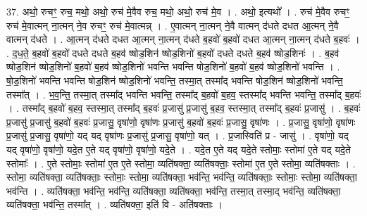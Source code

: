 \documentclass[17pt]{extarticle}
\begin{document}
37. अथो॒ रुचꣳ॒॒ रुच॒ मथो॒ अथो॒ रुच॑ मे॒वैव रुच॒ मथो॒ अथो॒ रुच॑ मे॒व । . अथो॒ इत्यथो᳚ । . रुच॑ मे॒वैव रुचꣳ॒॒ रुच॑ मे॒वात्मन् ना॒त्मन् ने॒व रुचꣳ॒॒ रुच॑ मे॒वात्मन्न् । . ए॒वात्मन् ना॒त्मन् ने॒वै वात्मन् द॑धते दधत आ॒त्मन् ने॒वै वात्मन् द॑धते । . आ॒त्मन् द॑धते दधत आ॒त्मन् ना॒त्मन् द॑धते ब॒हवो॑ ब॒हवो॑ दधत आ॒त्मन् ना॒त्मन् द॑धते ब॒हवः॑ । . द॒ध॒ते॒ ब॒हवो॑ ब॒हवो॑ दधते दधते ब॒हव॑ ष्षोड॒शिन॑ ष्षोड॒शिनो॑ ब॒हवो॑ दधते दधते ब॒हव॑ ष्षोड॒शिनः॑ । . ब॒हव॑ ष्षोड॒शिन॑ ष्षोड॒शिनो॑ ब॒हवो॑ ब॒हव॑ ष्षोड॒शिनो॑ भवन्ति भवन्ति षोड॒शिनो॑ ब॒हवो॑ ब॒हव॑ ष्षोड॒शिनो॑ भवन्ति । . षो॒ड॒शिनो॑ भवन्ति भवन्ति षोड॒शिन॑ ष्षोड॒शिनो॑ भवन्ति॒ तस्मा॒त् तस्मा᳚द् भवन्ति षोड॒शिन॑ ष्षोड॒शिनो॑ भवन्ति॒ तस्मा᳚त् । . भ॒व॒न्ति॒ तस्मा॒त् तस्मा᳚द् भवन्ति भवन्ति॒ तस्मा᳚द् ब॒हवो॑ ब॒हव॒ स्तस्मा᳚द् भवन्ति भवन्ति॒ तस्मा᳚द् ब॒हवः॑ । . तस्मा᳚द् ब॒हवो॑ ब॒हव॒ स्तस्मा॒त् तस्मा᳚द् ब॒हवः॑ प्र॒जासु॑ प्र॒जासु॑ ब॒हव॒ स्तस्मा॒त् तस्मा᳚द् ब॒हवः॑ प्र॒जासु॑ । . ब॒हवः॑ प्र॒जासु॑ प्र॒जासु॑ ब॒हवो॑ ब॒हवः॑ प्र॒जासु॒ वृषा॑णो॒ वृषा॑णः प्र॒जासु॑ ब॒हवो॑ ब॒हवः॑ प्र॒जासु॒ वृषा॑णः । . प्र॒जासु॒ वृषा॑णो॒ वृषा॑णः प्र॒जासु॑ प्र॒जासु॒ वृषा॑णो॒ यद् यद् वृषा॑णः प्र॒जासु॑ प्र॒जासु॒ वृषा॑णो॒ यत् । . प्र॒जास्विति॑ प्र - जासु॑ । . वृषा॑णो॒ यद् यद् वृषा॑णो॒ वृषा॑णो॒ यदे॒त ए॒ते यद् वृषा॑णो॒ वृषा॑णो॒ यदे॒ते । . यदे॒त ए॒ते यद् यदे॒ते स्तोमाः॒ स्तोमा॑ ए॒ते यद् यदे॒ते स्तोमाः᳚ । . ए॒ते स्तोमाः॒ स्तोमा॑ ए॒त ए॒ते स्तोमा॒ व्यति॑षक्ता॒ व्यति॑षक्ताः॒ स्तोमा॑ ए॒त ए॒ते स्तोमा॒ व्यति॑षक्ताः । . स्तोमा॒ व्यति॑षक्ता॒ व्यति॑षक्ताः॒ स्तोमाः॒ स्तोमा॒ व्यति॑षक्ता॒ भव॑न्ति॒ भव॑न्ति॒ व्यति॑षक्ताः॒ स्तोमाः॒ स्तोमा॒ व्यति॑षक्ता॒ भव॑न्ति । . व्यति॑षक्ता॒ भव॑न्ति॒ भव॑न्ति॒ व्यति॑षक्ता॒ व्यति॑षक्ता॒ भव॑न्ति॒ तस्मा॒त् तस्मा॒द् भव॑न्ति॒ व्यति॑षक्ता॒ व्यति॑षक्ता॒ भव॑न्ति॒ तस्मा᳚त् । . व्यति॑षक्ता॒ इति॑ वि - अति॑षक्ताः । \newline
\end{document}
